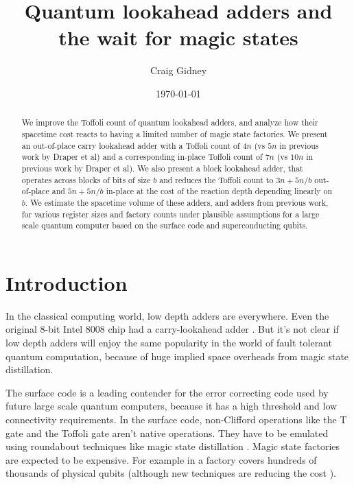 \documentclass[onecolumn,unpublished]{quantumarticle}
\title{Quantum lookahead adders and the wait for magic states}
\date{\today}
\author{Craig Gidney}
\affiliation{Google Inc., Santa Barbara, California 93117, USA}
\theoremstyle{definition}
\theoremstyle{definition}
\theoremstyle{definition}
\begin{document}
\maketitle

\begin{abstract}
    We improve the Toffoli count of quantum lookahead adders, and analyze how their spacetime cost reacts to having a limited number of magic state factories.
    We present an out-of-place carry lookahead adder with a Toffoli count of $4n$ (vs $5n$ in previous work by Draper et al) and a corresponding in-place Toffoli count of $7n$ (vs $10n$ in previous work by Draper et al).
    We also present a block lookahead adder, that operates across blocks of bits of size $b$ and reduces the Toffoli count to $3n + 5n/b$ out-of-place and $5n + 5n/b$ in-place at the cost of the reaction depth depending linearly on $b$.
    We estimate the spacetime volume of these adders, and adders from previous work, for various register sizes and factory counts under plausible assumptions for a large scale quantum computer based on the surface code and superconducting qubits.
\end{abstract}

\section{Introduction}

In the classical computing world, low depth adders are everywhere.
Even the original 8-bit Intel 8008 chip had a carry-lookahead adder \cite{shirriff2020reverseengineer8008}.
But it's not clear if low depth adders will enjoy the same popularity in the world of fault tolerant quantum computation, because of huge implied space overheads from magic state distillation.

The surface code \cite{fowler2012surfacereview} is a leading contender for the error correcting code used by future large scale quantum computers, because it has a high threshold and low connectivity requirements.
In the surface code, non-Clifford operations like the T gate and the Toffoli gate aren't native operations.
They have to be emulated using roundabout techniques like magic state distillation \cite{bravyi2005magicstate}.
Magic state factories are expected to be expensive.
For example in \cite{gidney2019catalyzed} a factory covers hundreds of thousands of physical qubits (although new techniques are reducing the cost \cite{litinski2019magicnotcostly}).
\end{document}
